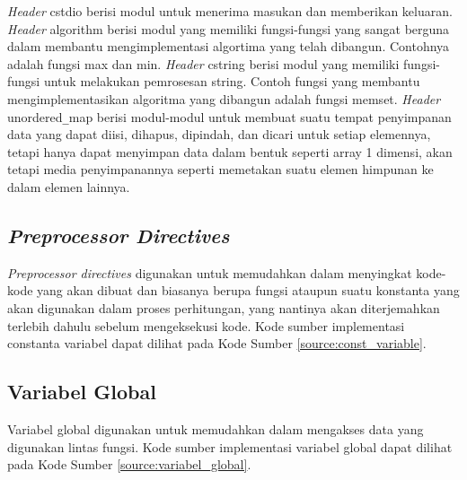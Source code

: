 

\textit{Header} {\selectfont cstdio} berisi modul untuk menerima masukan dan memberikan keluaran. \textit{Header} {\selectfont algorithm} berisi modul yang memiliki fungsi-fungsi yang sangat berguna dalam membantu mengimplementasi algortima yang telah dibangun. Contohnya adalah fungsi {\selectfont max} dan {\selectfont min}. \textit{Header} {\selectfont cstring }berisi modul yang memiliki fungsi-fungsi untuk melakukan pemrosesan {\selectfont string}. Contoh fungsi yang membantu mengimplementasikan algoritma yang dibangun adalah fungsi {\selectfont memset}. \textit{Header} {\selectfont unordered\verb|_|map} berisi modul-modul untuk membuat suatu tempat penyimpanan data yang dapat diisi, dihapus, dipindah, dan dicari untuk setiap elemennya, tetapi hanya dapat menyimpan data dalam bentuk seperti array 1 dimensi, akan tetapi media penyimpanannya seperti memetakan suatu elemen himpunan ke dalam elemen lainnya. 

\subsection{\textit{Preprocessor Directives}}
\textit{Preprocessor directives} digunakan untuk memudahkan dalam menyingkat kode-kode yang akan dibuat dan biasanya berupa fungsi ataupun suatu konstanta yang akan digunakan dalam proses perhitungan, yang nantinya akan diterjemahkan terlebih dahulu sebelum mengeksekusi kode. Kode sumber implementasi constanta variabel dapat dilihat pada Kode Sumber \ref{source:const_variable}.

\begin{minipage}{\linewidth}

\end{minipage}

\subsection{Variabel Global}
Variabel global digunakan untuk memudahkan dalam mengakses data yang digunakan lintas fungsi. Kode sumber implementasi variabel global dapat dilihat pada Kode Sumber \ref{source:variabel_global}.


